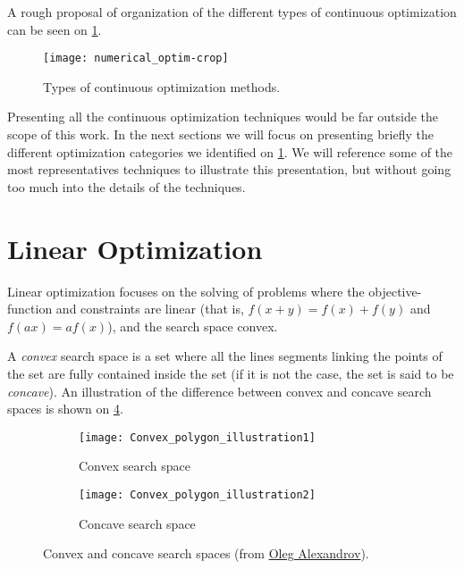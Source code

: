 A rough proposal of organization of the different types of continuous optimization can be seen on \figurename{} \ref{numerical_optim_tree}.

\begin{figure}
\texttt{[image: numerical\_optim-crop]}
\caption{Types of continuous optimization methods.}
\label{numerical_optim_tree}
\end{figure}

Presenting all the continuous optimization techniques would be far outside the scope of this work. In the next sections we will focus on presenting briefly the different optimization categories we identified on \figurename{} \ref{numerical_optim_tree}. We will reference some of the most representatives techniques to illustrate this presentation, but without going too much into the details of the techniques.

\section{Linear Optimization}\label{linear_optim}

Linear optimization focuses on the solving of problems where the objective-function and constraints are linear (that is, $f(x+y) = f(x)+f(y)$ and $f(ax) = af(x)$), and the search space convex.

A \emph{convex} search space is a set where all the lines segments linking the points of the set are fully contained inside the set (if it is not the case, the set is said to be \emph{concave}). An illustration of the difference between convex and concave search spaces is shown on \figurename{} \ref{convexVSconcave}.

\begin{figure}
\centering
	\begin{subfigure}{0.35\textwidth}
		\centering
		\texttt{[image: Convex\_polygon\_illustration1]}
		\caption{Convex search space}\label{convexVSconcave:conc}
	\end{subfigure}
	\begin{subfigure}{0.35\textwidth}
		\centering
		\texttt{[image: Convex\_polygon\_illustration2]}
		\caption{Concave search space}\label{convexVSconcave:conv}
	\end{subfigure}
	
	\caption{Convex and concave search spaces (from \href{http://commons.wikimedia.org/wiki/Category:Files_by_User:Oleg_Alexandrov_from_en.wikipedia}{Oleg Alexandrov}).}
	\label{convexVSconcave}

\end{figure}

